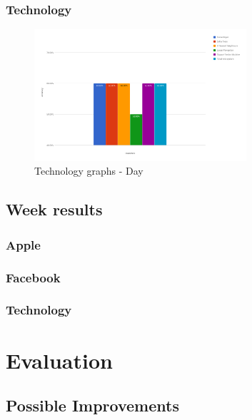 \documentclass[a4paper,11pt]{report}
\begin{document}
\subsection{Technology}
\begin{figure}[h!]
  \centering
  	\includegraphics[width=0.70\textwidth]{technology-day.png}
  \caption{Technology graphs - Day}
\end{figure}

\section {Week results}

\subsection{Apple}

\subsection{Facebook}

\subsection{Technology}



\chapter{Evaluation}
\label{chap:evaluation}
\section{Possible Improvements}

\end{document}
